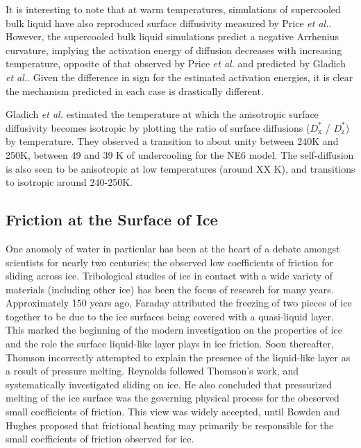 It is interesting to note that at warm temperatures, simulations of
supercooled bulk liquid\cite{Picaud2006,Mahoney2001} have also
reproduced surface diffusivity measured by Price \textit{et
  al.}. However, the supercooled bulk liquid simulations predict a
negative Arrhenius curvature, implying the
activation energy of diffusion decreases with increasing temperature,
opposite of that observed by Price \textit{et al.} and predicted by
Gladich \textit{et al.}. Given the difference in sign for the
estimated activation energies, it is clear the mechanism predicted in
each case is drastically different.

Gladich \textit{et al.} estimated the temperature at which the
anisotropic surface diffusivity becomes isotropic by plotting the
ratio of surface diffusions ($D^{*}_\mathrm{x}$ / $D^{*}_\mathrm{z}$)
by temperature. They observed a transition to about unity between 240K
and 250K, between 49 and 39 K of undercooling for the NE6 model.  The
self-diffusion is also seen to be anisotropic at low temperatures
(around XX K), and transitions to isotropic around 240-250K.



\subsection{Friction at the Surface of Ice}

One anomoly of water in particular has been at the heart of a debate
amongst scientists for nearly two centuries; the observed low
coefficients of friction for sliding across ice.  Tribological studies of
ice in contact with a wide variety of materials (including other ice)
has been the focus of research for many years.  Approximately 150
years ago, Faraday attributed the freezing of two pieces of ice
together to be due to the ice surfaces being covered with a
quasi-liquid layer.\cite{Faraday1859} This marked the beginning
of the modern investigation on the properties of ice and the role the
surface liquid-like layer plays in ice friction. Soon thereafter,
Thomson incorrectly attempted to explain the presence of the
liquid-like layer as a result of pressure melting.\cite{Thomson1859}
Reynolds followed Thomson's work, and systematically investigated
sliding on ice. He also concluded that pressurized melting of the ice
surface was the governing physical process for the obeserved small
coefficients of friction.\cite{Reynolds1901} This view was widely
accepted, until Bowden and Hughes proposed that frictional heating may
primarily be responsible for the small coefficients of friction
observed for ice.\cite{Bowden1939}

